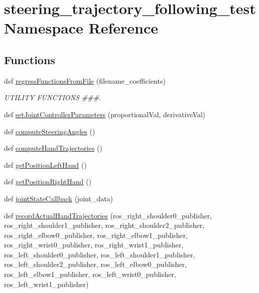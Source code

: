 \hypertarget{namespacesteering__trajectory__following__test}{}\section{steering\+\_\+trajectory\+\_\+following\+\_\+test Namespace Reference}
\label{namespacesteering__trajectory__following__test}
\subsection*{Functions}
\begin{DoxyCompactItemize}
\item 
def \mbox{\hyperlink{namespacesteering__trajectory__following__test_a09ce0e9b50241eec3bb69e5362b69159}{regress\+Functions\+From\+File}} (filename\+\_\+coefficients)
\begin{DoxyCompactList}\small\item\em U\+T\+I\+L\+I\+TY F\+U\+N\+C\+T\+I\+O\+NS \#\#\#. \end{DoxyCompactList}\item 
def \mbox{\hyperlink{namespacesteering__trajectory__following__test_aeb34a93dbcb90ea991b0c006e351b6f6}{set\+Joint\+Controller\+Parameters}} (proportional\+Val, derivative\+Val)
\item 
def \mbox{\hyperlink{namespacesteering__trajectory__following__test_a5d4d723b5836e3ff73ecf1548a0f96e4}{compute\+Steering\+Angles}} ()
\item 
def \mbox{\hyperlink{namespacesteering__trajectory__following__test_a378cc54eed1c58dc9d547aea3d6f14c9}{compute\+Hand\+Trajectories}} ()
\item 
def \mbox{\hyperlink{namespacesteering__trajectory__following__test_a0f76013b90d9b49c61ca4054512e5852}{get\+Position\+Left\+Hand}} ()
\item 
def \mbox{\hyperlink{namespacesteering__trajectory__following__test_a69336b47326639e5108afdb6eec04bfa}{get\+Position\+Right\+Hand}} ()
\item 
def \mbox{\hyperlink{namespacesteering__trajectory__following__test_a6356c27c30a8d888ab126157624e9944}{joint\+State\+Callback}} (joint\+\_\+data)
\item 
def \mbox{\hyperlink{namespacesteering__trajectory__following__test_a143549e166bd92e4c144e7fd9f9194bb}{record\+Actual\+Hand\+Trajectories}} (ros\+\_\+right\+\_\+shoulder0\+\_\+publisher, ros\+\_\+right\+\_\+shoulder1\+\_\+publisher, ros\+\_\+right\+\_\+shoulder2\+\_\+publisher, ros\+\_\+right\+\_\+elbow0\+\_\+publisher, ros\+\_\+right\+\_\+elbow1\+\_\+publisher, ros\+\_\+right\+\_\+wrist0\+\_\+publisher, ros\+\_\+right\+\_\+wrist1\+\_\+publisher, ros\+\_\+left\+\_\+shoulder0\+\_\+publisher, ros\+\_\+left\+\_\+shoulder1\+\_\+publisher, ros\+\_\+left\+\_\+shoulder2\+\_\+publisher, ros\+\_\+left\+\_\+elbow0\+\_\+publisher, ros\+\_\+left\+\_\+elbow1\+\_\+publisher, ros\+\_\+left\+\_\+wrist0\+\_\+publisher, ros\+\_\+left\+\_\+wrist1\+\_\+publisher)

\end{DoxyCompactItemize}
